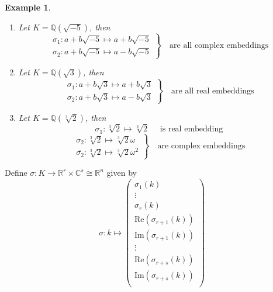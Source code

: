\documentclass[11pt]{book}
\newtheorem{example}[theorem]{Example}
\begin{document}
\begin{example}
    \begin{enumerate}
        \item Let $K=\mathbb{Q}(\sqrt{-5})$, then 
        \[
        \left.\begin{aligned}
            \sigma_{1}:a+b\sqrt{-5}\mapsto a+b\sqrt{-5}\\
            \sigma_{2}:a+b\sqrt{-5}\mapsto a-b\sqrt{-5}
        \end{aligned}\right\} \quad \text{are all complex embeddings}
        \]
        \item Let $K=\mathbb{Q}(\sqrt{3})$, then  
        \[
        \left.\begin{aligned}
            \sigma_{1}:a+b\sqrt{3}\mapsto a+b\sqrt{3}\\
            \sigma_{2}:a+b\sqrt{3}\mapsto a-b\sqrt{3}
        \end{aligned}\right\} \quad \text{are all real embeddings}
        \]
        \item Let $K=\mathbb{Q}(\sqrt[3]{2})$, then 
        \[
        \sigma_{1}:\sqrt[3]{2}\mapsto \sqrt[3]{2}\quad \text{ is real embedding}
        \]
        \[
        \left.\begin{aligned}
            \sigma_{2}:\sqrt[3]{2}\mapsto \sqrt[3]{2}\omega\\
            \overline{\sigma_{2}}:\sqrt[3]{2}\mapsto \sqrt[3]{2}\omega^{2}
        \end{aligned}\right\} \quad \text{are complex embeddings}
        \]
    \end{enumerate}
\end{example}

Define $\sigma:K\to \mathbb{R}^{r}\times \mathbb{C}^{s}\cong \mathbb{R}^{n}$ given by 
\[
\sigma: k\mapsto \begin{pmatrix}
    \sigma_{1}(k)\\
    \vdots\\
    \sigma_{r}(k)\\
    \mathrm{Re}(\sigma_{r+1}(k))\\
    \mathrm{Im}(\sigma_{r+1}(k))\\
    \vdots\\
    \mathrm{Re}(\sigma_{r+s}(k))\\
    \mathrm{Im}(\sigma_{r+s}(k))\\
\end{pmatrix}
\]
\end{document}
